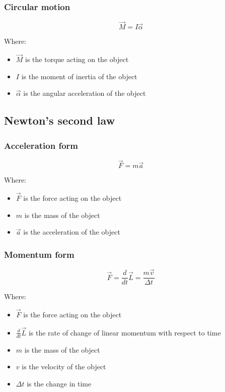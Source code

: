 \documentclass[11pt]{article}
\begin{document}
\subsubsection{Circular motion}
\label{sec:orge5c061c}
\[\vec{M} = I \vec{\alpha}\]

Where:
\begin{itemize}
\item \(\vec{M}\) is the torque acting on the object
\item \(I\) is the moment of inertia of the object
\item \(\vec{\alpha}\) is the angular acceleration of the object
\end{itemize}

\subsection{Newton's second law}
\label{sec:org379ff53}

\subsubsection{Acceleration form}
\label{sec:org951cc4a}
\[\vec{F} = m \vec{a}\]

Where:
\begin{itemize}
\item \(\vec{F}\) is the force acting on the object
\item \(m\) is the mass of the object
\item \(\vec{a}\) is the acceleration of the object
\end{itemize}

\subsubsection{Momentum form}
\label{sec:org0c572a2}
\[\vec{F} = \frac{d}{dt} \vec{L} = \frac{m \vec{v}}{\Delta t}\]

Where:
\begin{itemize}
\item \(\vec{F}\) is the force acting on the object
\item \(\frac{d}{dt} \vec{L}\) is the rate of change of linear momentum with respect to time
\item \(m\) is the mass of the object
\item \(v\) is the velocity of the object
\item \(\Delta t\) is the change in time
\end{itemize}
\end{document}
